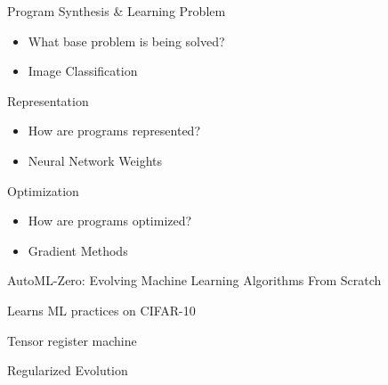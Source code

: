 \documentclass[aspectratio=169]{beamer}
\makeatletter
\renewcommand{\emph}[1]{{\Huge \color{pureminimalistic@text@red} #1}}
\newcommand{\white}[1]{{\color{pureminimalistic@text@white} #1}}
\newcommand{\ce}[1]{{\color{c4} #1}}
\makeatother
\begin{document}
\begin{frame}{\white{Program Synthesis \& Learning}}
    \vspace{0.2em}
    \emph{Problem} 
    \begin{itemize}
        \item What base problem is being solved?
        \pause
        \item \ce{Image Classification}
    \end{itemize}
    \vspace{0.5em}
    \emph{Representation} 
    \begin{itemize}
        \item How are programs represented?
        \pause
        \item \ce{Neural Network Weights}
    \end{itemize}
    \vspace{0.5em}
    \emph{Optimization} 
    \begin{itemize}
        \item How are programs optimized?
        \pause
        \item \ce{Gradient Methods}
    \end{itemize}
\end{frame}

\begin{frame}{AutoML-Zero: Evolving Machine Learning Algorithms From Scratch \white{\cite{real2020automl}}}
    \begin{vfilleditems}
        \item \Huge Learns ML practices on CIFAR-10 
        \vspace{0.7em}
        \item \Huge Tensor register machine
        \vspace{0.7em}
        \item \emph{Regularized Evolution} 
    \end{vfilleditems}
\end{frame}
\end{document}
